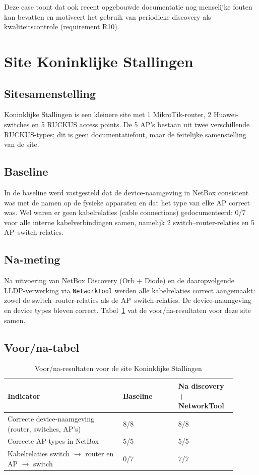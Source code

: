 Deze case toont dat ook recent opgebouwde documentatie nog menselijke fouten kan bevatten en motiveert het gebruik van periodieke discovery als kwaliteitscontrole (requirement R10).

\section{Site Koninklijke Stallingen}
\label{sec:ks}

\subsection{Site\-samen\-stelling}

Koninklijke Stallingen is een kleinere site met 1 MikroTik-router, 2 Huawei-switches en 5 RUCKUS access points. De 5 AP's bestaan uit twee verschillende RUCKUS-types; dit is geen documentatiefout, maar de feitelijke samenstelling van de site.

\subsection{Baseline}

In de baseline werd vastgesteld dat de device-naamgeving in NetBox consistent was met de namen op de fysieke apparaten en dat het type van elke AP correct was. Wel waren er geen kabelrelaties (cable connections) gedocumenteerd: 0/7 voor alle interne kabelverbindingen samen, namelijk 2 switch--router-relaties en 5 AP--switch-relaties.

\subsection{Na-meting}

Na uitvoering van NetBox Discovery (Orb + Diode) en de daaropvolgende LLDP-verwerking via \texttt{NetworkTool} werden alle kabelrelaties correct aangemaakt: zowel de switch--router-relaties als de AP--switch-relaties. De device-naamgeving en device types bleven correct. Tabel~\ref{tab:ks-voor-na} vat de voor/na-resultaten voor deze site samen.

\subsection{Voor/na-tabel}

\begin{table}[H]
  \centering
  \caption[Voor/na-resultaten Koninklijke Stallingen]{Voor/na-resultaten voor de site Koninklijke Stallingen}
  \label{tab:ks-voor-na}
  \begin{tabular}{p{0.46\linewidth} p{0.22\linewidth} p{0.22\linewidth}}
    \toprule
    \textbf{Indicator} & \textbf{Baseline} & \textbf{Na discovery + NetworkTool} \\
    \midrule
    Correcte device-naamgeving (router, switches, AP's) & 8/8 & 8/8 \\
    Correcte AP-types in NetBox & 5/5 & 5/5 \\
    Kabelrelaties switch $\rightarrow$ router en AP $\rightarrow$ switch & 0/7 & 7/7 \\
    \bottomrule
  \end{tabular}
\end{table}

